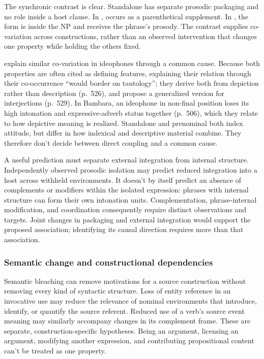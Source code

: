 \documentclass[12pt]{article}
\begin{document}
The synchronic contrast is clear. Standalone  has separate prosodic packaging and no role inside a host clause. In ,  occurs as a parenthetical supplement. In , the form is inside the NP and receives the phrase's prosody. The contrast supplies co-variation across constructions, rather than an observed intervention that changes one property while holding the others fixed.

\textcite{dingemanseakita2017} explain similar co-variation in ideophones through a common cause. Because both properties are often cited as defining features, explaining their relation through their co-occurrence \enquote{would border on tautology}; they derive both from depiction rather than description (p.~526), and propose a generalized version for interjections (p.~529). In Bambara, an ideophone in non-final position loses its high intonation and expressive-adverb status together (p.~506), which they relate to how depictive meaning is realized. Standalone and prenominal  both index attitude, but differ in how indexical and descriptive material combine. They therefore don't decide between direct coupling and a common cause.

A useful prediction must separate external integration from internal structure. Independently observed prosodic isolation may predict reduced integration into a host across withheld environments. It doesn't by itself predict an absence of complements or modifiers within the isolated expression: phrases with internal structure can form their own intonation units. Complementation, phrase-internal modification, and coordination consequently require distinct observations and targets. Joint changes in packaging and external integration would support the proposed association; identifying its causal direction requires more than that association.

\subsubsection{Semantic change and constructional dependencies}

Semantic bleaching can remove motivations for a source construction without removing every kind of syntactic structure. Loss of entity reference in an invocative use may reduce the relevance of nominal environments that introduce, identify, or quantify the source referent. Reduced use of a verb's source event meaning may similarly accompany changes in its complement frame. These are separate, construction-specific hypotheses. Being an argument, licensing an argument, modifying another expression, and contributing propositional content can't be treated as one property.
\end{document}
